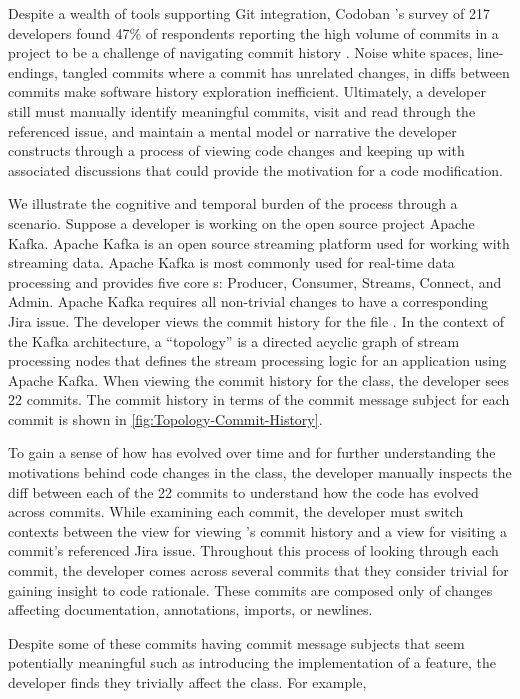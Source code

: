 Despite a wealth of tools supporting Git integration, Codoban \etal's survey of 217 developers found 47\% of respondents reporting the high volume of commits in a project to be a challenge of navigating commit history \cite{codoban_software_2015}. 
Noise \eg white spaces, line-endings, tangled commits where a commit has unrelated changes, \etc in diffs between commits make software history exploration inefficient. 
Ultimately, a developer still must manually identify meaningful commits, visit and read through the referenced issue, and maintain a mental model or narrative the developer constructs through a process of viewing code changes and keeping up with associated discussions that could provide the motivation for a code modification. 

We illustrate the cognitive and temporal burden of the process through a scenario.
Suppose a developer is working on the open source project Apache Kafka. 
Apache Kafka is an open source streaming platform used for working with streaming data. Apache Kafka is most commonly used for real-time data processing and provides five core s: Producer, Consumer, Streams, Connect, and Admin.
Apache Kafka requires all non-trivial changes to have a corresponding Jira issue. 
The developer views the commit history for the file .
In the context of the Kafka architecture, a ``topology'' is a directed acyclic graph of stream processing nodes that defines the stream processing logic for an application using Apache Kafka.
When viewing the commit history for the  class, the developer sees 22 commits.
The commit history in terms of the commit message subject for each commit is shown in \autoref{fig:Topology-Commit-History}.

To gain a sense of how  has evolved over time and for further understanding the motivations behind code changes in the class, the developer manually inspects the diff between each of the 22 commits to understand how the code has evolved across commits.
While examining each commit, the developer must switch contexts between the view for viewing 's commit history and a view for visiting a commit's referenced Jira issue.
Throughout this process of looking through each commit, the developer comes across several commits that they consider trivial for gaining insight to code rationale. 
These commits are composed only of changes affecting documentation, annotations, imports, or newlines. 

Despite some of these commits having commit message subjects that seem potentially meaningful such as introducing the implementation of a feature, the developer finds they trivially affect the  class. 
For example, 

